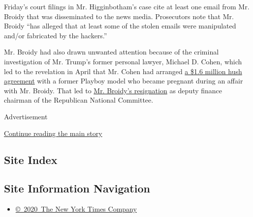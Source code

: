 Friday's court filings in Mr. Higginbotham's case cite at least one
email from Mr. Broidy that was disseminated to the news media.
Prosecutors note that Mr. Broidy ``has alleged that at least some of the
stolen emails were manipulated and/or fabricated by the hackers.''

Mr. Broidy had also drawn unwanted attention because of the criminal
investigation of Mr. Trump's former personal lawyer, Michael D. Cohen,
which led to the revelation in April that Mr. Cohen had arranged
\href{https://www.nytimes.com/2018/04/13/us/politics/elliott-broidy-michael-cohen-payout.html?module=inline}{a
\$1.6 million hush agreement} with a former Playboy model who became
pregnant during an affair with Mr. Broidy. That led to
\href{https://www.nytimes.com/2018/04/13/us/politics/elliott-broidy-michael-cohen-payout.html?module=inline}{Mr.
Broidy's resignation} as deputy finance chairman of the Republican
National Committee.

Advertisement

\protect\hyperlink{after-bottom}{Continue reading the main story}

\hypertarget{site-index}{%
\subsection{Site Index}\label{site-index}}

\hypertarget{site-information-navigation}{%
\subsection{Site Information
Navigation}\label{site-information-navigation}}

\begin{itemize}
\tightlist
\item
  \href{https://help.nytimes.com/hc/en-us/articles/115014792127-Copyright-notice}{©~2020~The
  New York Times Company}
\end{itemize}

